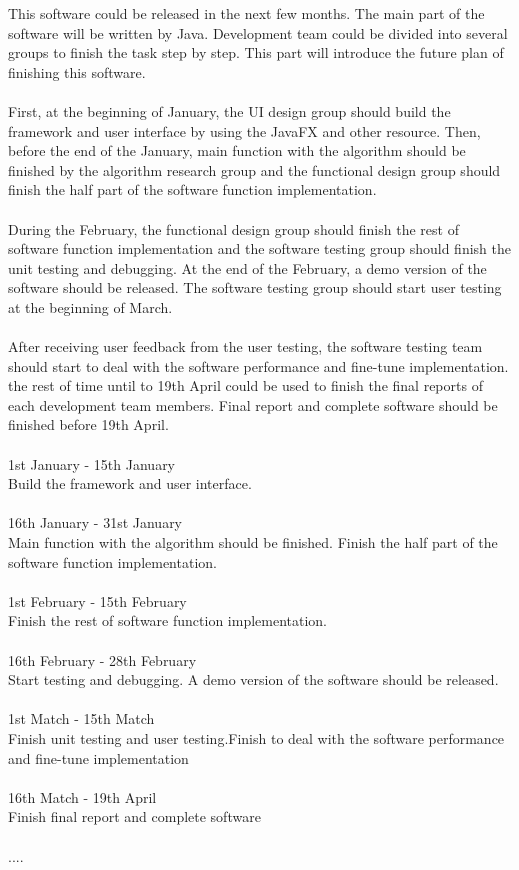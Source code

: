 \documentclass[11pt,oneside,a4paper]{article}
\begin{document}
This software could be released in the next few months. The main part of the software will be written by Java. Development team could be divided into several groups to finish the task step by step. This part will introduce the future plan of finishing this software.
\\\\First, at the beginning of January, the UI design group should build the framework and user interface by using the JavaFX and other resource. Then, before the end of the January, main function with the algorithm should be finished by the algorithm research group and the functional design group should finish the half part of the software function implementation.
\\\\During the February, the functional design group should finish the rest of software function implementation and the software testing group should finish the unit testing and debugging. At the end of the February, a demo version of the software should be released. The software testing group should start user testing at the beginning of March.
\\\\After receiving user feedback from the user testing, the software testing team should start to deal with the software performance and fine-tune implementation. the rest of time until to 19th April could be used to finish the final reports of each development team members. Final report and complete software should be finished before 19th April.
\vspace{20}
\\\\1st January - 15th January
\\Build the framework and user interface.
\\\\16th January - 31st January
\\Main function with the algorithm should be finished.
Finish the half part of the software function implementation.
\\\\1st February - 15th February
\\Finish the rest of software function implementation.
\\\\16th February - 28th February
\\Start testing and debugging. A demo version of the software should be released.
\\\\1st Match - 15th Match
\\Finish unit testing and user testing.Finish to deal with the software performance and fine-tune implementation
\\\\16th Match - 19th April
\\Finish final report and complete software
\\\\....
\end{document}
